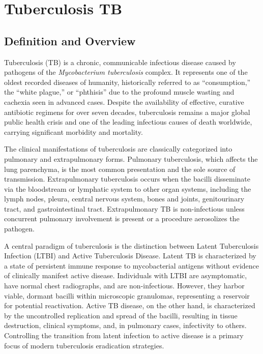 \chapter{Tuberculosis TB}

\section*{Definition and Overview}
Tuberculosis (TB) is a chronic, communicable infectious disease caused by pathogens of the \textit{Mycobacterium tuberculosis} complex. It represents one of the oldest recorded diseases of humanity, historically referred to as ``consumption,'' the ``white plague,'' or ``phthisis'' due to the profound muscle wasting and cachexia seen in advanced cases. Despite the availability of effective, curative antibiotic regimens for over seven decades, tuberculosis remains a major global public health crisis and one of the leading infectious causes of death worldwide, carrying significant morbidity and mortality.

The clinical manifestations of tuberculosis are classically categorized into pulmonary and extrapulmonary forms. Pulmonary tuberculosis, which affects the lung parenchyma, is the most common presentation and the sole source of transmission. Extrapulmonary tuberculosis occurs when the bacilli disseminate via the bloodstream or lymphatic system to other organ systems, including the lymph nodes, pleura, central nervous system, bones and joints, genitourinary tract, and gastrointestinal tract. Extrapulmonary TB is non-infectious unless concurrent pulmonary involvement is present or a procedure aerosolizes the pathogen.

A central paradigm of tuberculosis is the distinction between Latent Tuberculosis Infection (LTBI) and Active Tuberculosis Disease. Latent TB is characterized by a state of persistent immune response to mycobacterial antigens without evidence of clinically manifest active disease. Individuals with LTBI are asymptomatic, have normal chest radiographs, and are non-infectious. However, they harbor viable, dormant bacilli within microscopic granulomas, representing a reservoir for potential reactivation. Active TB disease, on the other hand, is characterized by the uncontrolled replication and spread of the bacilli, resulting in tissue destruction, clinical symptoms, and, in pulmonary cases, infectivity to others. Controlling the transition from latent infection to active disease is a primary focus of modern tuberculosis eradication strategies.

